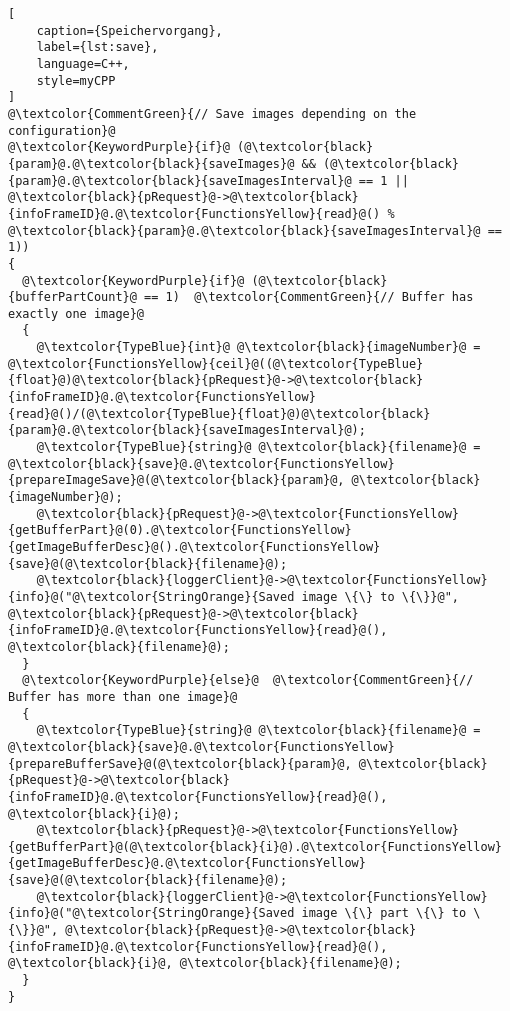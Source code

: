 \begin{lstlisting}[
    caption={Speichervorgang},
    label={lst:save},
    language=C++,
    style=myCPP
]
@\textcolor{CommentGreen}{// Save images depending on the configuration}@
@\textcolor{KeywordPurple}{if}@ (@\textcolor{black}{param}@.@\textcolor{black}{saveImages}@ && (@\textcolor{black}{param}@.@\textcolor{black}{saveImagesInterval}@ == 1 || @\textcolor{black}{pRequest}@->@\textcolor{black}{infoFrameID}@.@\textcolor{FunctionsYellow}{read}@() % @\textcolor{black}{param}@.@\textcolor{black}{saveImagesInterval}@ == 1))
{
  @\textcolor{KeywordPurple}{if}@ (@\textcolor{black}{bufferPartCount}@ == 1)  @\textcolor{CommentGreen}{// Buffer has exactly one image}@
  {
    @\textcolor{TypeBlue}{int}@ @\textcolor{black}{imageNumber}@ = @\textcolor{FunctionsYellow}{ceil}@((@\textcolor{TypeBlue}{float}@)@\textcolor{black}{pRequest}@->@\textcolor{black}{infoFrameID}@.@\textcolor{FunctionsYellow}{read}@()/(@\textcolor{TypeBlue}{float}@)@\textcolor{black}{param}@.@\textcolor{black}{saveImagesInterval}@);
    @\textcolor{TypeBlue}{string}@ @\textcolor{black}{filename}@ = @\textcolor{black}{save}@.@\textcolor{FunctionsYellow}{prepareImageSave}@(@\textcolor{black}{param}@, @\textcolor{black}{imageNumber}@);
    @\textcolor{black}{pRequest}@->@\textcolor{FunctionsYellow}{getBufferPart}@(0).@\textcolor{FunctionsYellow}{getImageBufferDesc}@().@\textcolor{FunctionsYellow}{save}@(@\textcolor{black}{filename}@);
    @\textcolor{black}{loggerClient}@->@\textcolor{FunctionsYellow}{info}@("@\textcolor{StringOrange}{Saved image \{\} to \{\}}@", @\textcolor{black}{pRequest}@->@\textcolor{black}{infoFrameID}@.@\textcolor{FunctionsYellow}{read}@(), @\textcolor{black}{filename}@);
  }
  @\textcolor{KeywordPurple}{else}@  @\textcolor{CommentGreen}{// Buffer has more than one image}@
  {
    @\textcolor{TypeBlue}{string}@ @\textcolor{black}{filename}@ = @\textcolor{black}{save}@.@\textcolor{FunctionsYellow}{prepareBufferSave}@(@\textcolor{black}{param}@, @\textcolor{black}{pRequest}@->@\textcolor{black}{infoFrameID}@.@\textcolor{FunctionsYellow}{read}@(), @\textcolor{black}{i}@);
    @\textcolor{black}{pRequest}@->@\textcolor{FunctionsYellow}{getBufferPart}@(@\textcolor{black}{i}@).@\textcolor{FunctionsYellow}{getImageBufferDesc}@.@\textcolor{FunctionsYellow}{save}@(@\textcolor{black}{filename}@);
    @\textcolor{black}{loggerClient}@->@\textcolor{FunctionsYellow}{info}@("@\textcolor{StringOrange}{Saved image \{\} part \{\} to \{\}}@", @\textcolor{black}{pRequest}@->@\textcolor{black}{infoFrameID}@.@\textcolor{FunctionsYellow}{read}@(), @\textcolor{black}{i}@, @\textcolor{black}{filename}@);
  }
}
\end{lstlisting}

